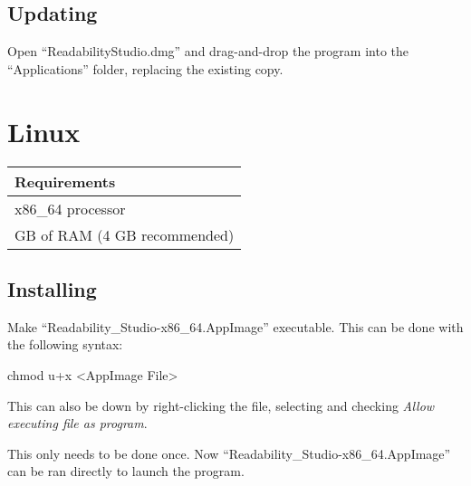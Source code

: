 \documentclass[
  letterpaper,
]{LegrandOrangeBook}
\newenvironment{Shaded}{\begin{snugshade}}{\end{snugshade}}
\newcommand{\NormalTok}[1]{\textcolor[rgb]{0.00,0.23,0.31}{#1}}
\newcommand{\SpecialCharTok}[1]{\textcolor[rgb]{0.37,0.37,0.37}{#1}}
\begin{document}
\section*{Updating}\label{updating-1}


Open ``ReadabilityStudio.dmg'' and drag-and-drop the program into the
``Applications'' folder, replacing the existing copy.

\chapter{\texorpdfstring{Linux \faLinux }{Linux }}\label{linux}

\begin{longtable}[]{@{}
  >{\raggedright\arraybackslash}p{}@{}}
\toprule\noalign{}
\begin{minipage}[b]{\linewidth}\raggedright
Requirements
\end{minipage} \\
\midrule\noalign{}
\endhead
\bottomrule\noalign{}
\endlastfoot
x86\_64 processor \\
2 GB of RAM (4 GB recommended) \\
\end{longtable}

\section*{Installing}\label{installing-3}


Make ``Readability\_Studio-x86\_64.AppImage'' executable. This can be
done with the following syntax:

\begin{Shaded}
\begin{Highlighting}[]
\NormalTok{chmod u}\SpecialCharTok{+}\NormalTok{x }\SpecialCharTok{\textless{}}\NormalTok{AppImage File}\SpecialCharTok{\textgreater{}}
\end{Highlighting}
\end{Shaded}

This can also be down by right-clicking the file, selecting
 and checking \emph{Allow executing
file as program}.

This only needs to be done once. Now
``Readability\_Studio-x86\_64.AppImage'' can be ran directly to launch
the program.
\end{document}
